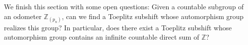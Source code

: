 \documentclass{daj}
\theoremstyle{plain}
\theoremstyle{definition}
\begin{document}
We finish this section with some open questions: Given a countable subgroup of an odometer $\mathbb{Z}_{(p_n)}$, can we find a Toeplitz subshift whose automorphism group realizes this group?  In particular, does there exist a Toeplitz subshift whose automorphism group contains an infinite countable direct sum of $\mathbb{Z}$?








\end{document}
